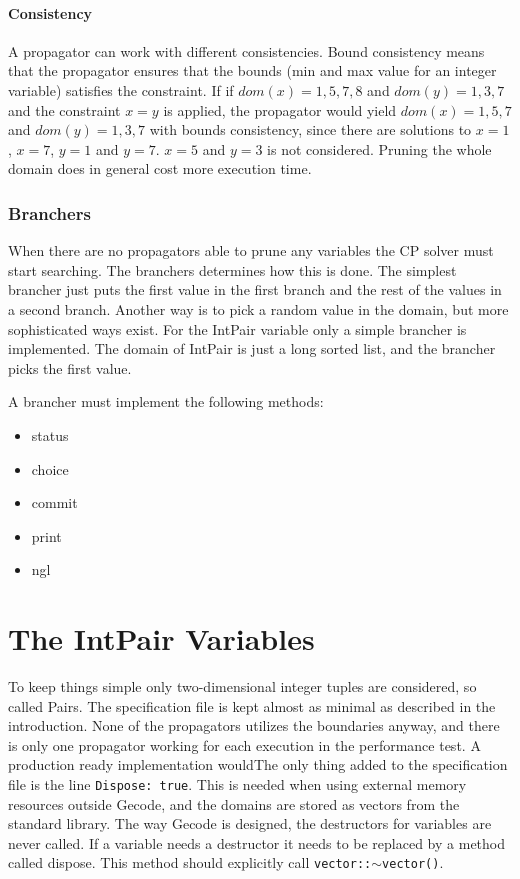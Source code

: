 \documentclass[a4paper,11pt]{article}
\begin{document}
\paragraph{Consistency}
A propagator can work with different consistencies. Bound consistency means that the propagator ensures that the bounds (min and max value for an integer variable) satisfies the constraint. If if $dom(x)={1,5,7,8}$ and $dom(y)={1,3,7}$ and the constraint $x=y$ is applied, the propagator would yield $dom(x)={1,5,7}$ and $dom(y)={1,3,7}$ with bounds consistency, since there are solutions to $x=1$, $x=7$, $y=1$ and $y=7$. $x=5$ and $y=3$ is not considered. Pruning the whole domain does in general cost more execution time.

\subsubsection{Branchers}
When there are no propagators able to prune any variables the CP solver must start searching. The branchers determines how this is done. The simplest brancher just puts the first value in the first branch and the rest of the values in a second branch. Another way is to pick a random value in the domain, but more sophisticated ways exist. For the IntPair variable only a simple brancher is implemented. The domain of IntPair is just a long sorted list, and the brancher picks the first value.

A brancher must implement the following methods:
\begin{itemize}
\item{status}
\item{choice}
\item{commit}
\item{print}
\item{ngl}
\end{itemize}

\section{The IntPair Variables}
To keep things simple only two-dimensional integer tuples are considered, so called Pairs. The specification file is kept almost as minimal as described in the introduction. None of the propagators utilizes the boundaries anyway, and there is only one propagator working for each execution in the performance test. A production ready implementation wouldThe only thing added to the specification file is the line \texttt{Dispose: true}. This is needed when using external memory resources outside Gecode, and the domains are stored as vectors from the standard library. The way Gecode is designed, the destructors for variables are never called. If a variable needs a destructor it needs to be replaced by a method called dispose. This method should explicitly call \texttt{vector::$\sim$vector()}.
\end{document}
